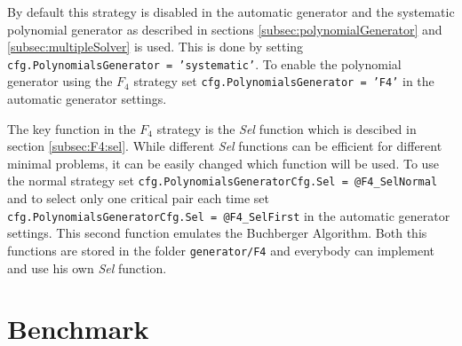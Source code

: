 By default this strategy is disabled in the automatic generator and the systematic polynomial generator as described in sections \ref{subsec:polynomialGenerator} and \ref{subsec:multipleSolver} is used. This is done by setting \texttt{cfg.PolynomialsGenerator = 'systematic'}. To enable the polynomial generator using the $F_4$ strategy set \texttt{cfg.PolynomialsGenerator = 'F4'} in the automatic generator settings.

The key function in the $F_4$ strategy is the \textit{Sel} function which is descibed in section \ref{subsec:F4:sel}. While different \textit{Sel} functions can be efficient for different minimal problems, it can be easily changed which function will be used. To use the normal strategy set \texttt{cfg.PolynomialsGeneratorCfg.Sel = @F4\_SelNormal} and to select only one critical pair each time set \texttt{cfg.PolynomialsGeneratorCfg.Sel = @F4\_SelFirst} in the automatic generator settings. This second function emulates the Buchberger Algorithm. Both this functions are stored in the folder \texttt{generator/F4} and everybody can implement and use his own \textit{Sel} function.

\section{Benchmark}
